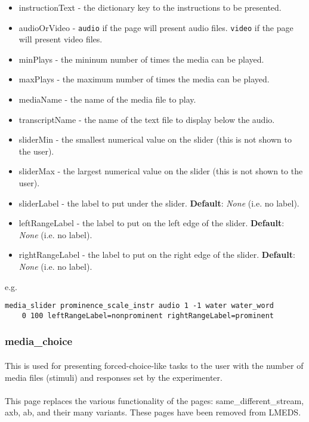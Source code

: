\begin{itemize}
\item instructionText - the dictionary key to the instructions to be presented.
\item audioOrVideo - \texttt{audio} if the page will present audio files.  \texttt{video} if the page will present video files.
\item minPlays - the mininum number of times the media can be played.
\item maxPlays - the maximum number of times the media can be played.
\item mediaName - the name of the media file to play.
\item transcriptName - the name of the text file to display below the audio.
\item sliderMin - the smallest numerical value on the slider (this is not shown to the user).
\item sliderMax - the largest numerical value on the slider (this is not shown to the user).
\item sliderLabel - the label to put under the slider.  \textbf{Default}: \textit{None} (i.e. no label).
\item leftRangeLabel - the label to put on the left edge of the slider. \textbf{Default}: \textit{None} (i.e. no label).
\item rightRangeLabel - the label to put on the right edge of the slider. \textbf{Default}: \textit{None} (i.e. no label).
\end{itemize}

e.g.
\begin{lstlisting}
media_slider prominence_scale_instr audio 1 -1 water water_word 
	0 100 leftRangeLabel=nonprominent rightRangeLabel=prominent
\end{lstlisting}


\subsubsection{media\_choice}

\paragraph{}
This is used for presenting forced-choice-like tasks to the user with the number of media files (stimuli) and responses set by the experimenter.

\paragraph{}
This page replaces the various functionality of the pages: same\_different\_stream, axb, ab, and their many variants.  These pages have been removed from LMEDS.

